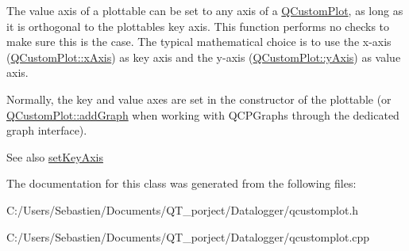 The value axis of a plottable can be set to any axis of a \hyperlink{class_q_custom_plot}{Q\+Custom\+Plot}, as long as it is orthogonal to the plottable\textquotesingle{}s key axis. This function performs no checks to make sure this is the case. The typical mathematical choice is to use the x-\/axis (\hyperlink{class_q_custom_plot_a9a79cd0158a4c7f30cbc702f0fd800e4}{Q\+Custom\+Plot\+::x\+Axis}) as key axis and the y-\/axis (\hyperlink{class_q_custom_plot_af6fea5679725b152c14facd920b19367}{Q\+Custom\+Plot\+::y\+Axis}) as value axis.

Normally, the key and value axes are set in the constructor of the plottable (or \hyperlink{class_q_custom_plot_a6fb2873d35a8a8089842d81a70a54167}{Q\+Custom\+Plot\+::add\+Graph} when working with Q\+C\+P\+Graphs through the dedicated graph interface).

\begin{DoxySeeAlso}{See also}
\hyperlink{class_q_c_p_abstract_plottable_a8524fa2994c63c0913ebd9bb2ffa3920}{set\+Key\+Axis} 
\end{DoxySeeAlso}


The documentation for this class was generated from the following files\+:\begin{DoxyCompactItemize}
\item 
C\+:/\+Users/\+Sebastien/\+Documents/\+Q\+T\+\_\+porject/\+Datalogger/qcustomplot.\+h\item 
C\+:/\+Users/\+Sebastien/\+Documents/\+Q\+T\+\_\+porject/\+Datalogger/qcustomplot.\+cpp\end{DoxyCompactItemize}
